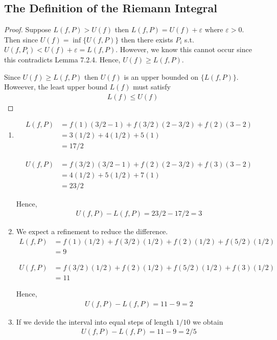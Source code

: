 \subsection{The Definition of the Riemann Integral}

\begin{proof}
    Suppose $L(f,P)>U(f)$ then $L(f,P) = U(f)+\varepsilon$ where 
    $\varepsilon>0$. Then since $U(f) = \inf\{U(f,P)\}$ then 
    there exists $P_i$ s.t. $U(f, P_i) < U(f)+\varepsilon = L(f, P)$.
    However, we know this cannot occur since this contradicts Lemma 7.2.4.
    Hence, $U(f)\geq L(f,P)$.
    
    Since $U(f)\geq L(f,P)$ then $U(f)$ is an upper bounded on 
    $\{L(f,P)\}$. Howeever, the least upper bound $L(f)$ must satisfy
    \begin{align*}
        L(f) \leq U(f)
    \end{align*}
\end{proof}

\begin{enumerate}[label=(\alph*)]
    \item 
    \begin{align*}
        L(f,P) &= f(1)(3/2-1) + f(3/2)(2-3/2) + f(2)(3-2) \\    
                &= 3(1/2)+4(1/2)+5(1) \\
                &= 17/2
    \end{align*}

    \begin{align*}
        U(f,P) &= f(3/2)(3/2-1) + f(2)(2-3/2) + f(3)(3-2) \\    
                &= 4(1/2)+5(1/2)+7(1) \\
                &= 23/2
    \end{align*}

    Hence, 
    \begin{align*}
        U(f,P) - L(f,P) = 23/2-17/2 = 3
    \end{align*}

    \item
    We expect a refinement to reduce the difference. 
    \begin{align*}
        L(f,P) &= f(1)(1/2) + f(3/2)(1/2) + f(2)(1/2) + f(5/2)(1/2) \\    
                &= 9
    \end{align*}

    \begin{align*}
        U(f,P) &= f(3/2)(1/2) + f(2)(1/2) + f(5/2)(1/2) + f(3)(1/2) \\    
                &= 11
    \end{align*}

    Hence, 
    \begin{align*}
        U(f,P) - L(f,P) = 11 - 9 = 2
    \end{align*}

    \item
    If we devide the interval into equal steps of length $1/10$
    we obtain
    \begin{align*}
        U(f,P) - L(f,P) = 11 - 9 = 2/5
    \end{align*}
\end{enumerate}

